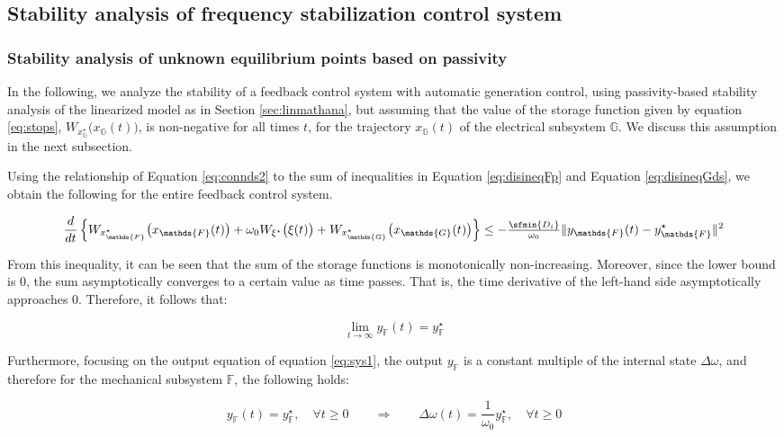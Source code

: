\documentclass[graybox, envcountchap]{svmult}
\begin{document}
\subsection{Stability analysis of frequency stabilization control system}\label{sec:potconv}

\smallskip
\subsubsection{Stability analysis of unknown equilibrium points based on passivity}

In the following, we analyze the stability of a feedback control system with
automatic generation control, using passivity-based stability analysis of the
linearized model as in Section \ref{sec:linmathana}, but assuming that the value
of the storage function given by equation \ref{eq:stops},
$W_{x^{\star}_{\mathds{G}}}\bigl(x_{\mathds{G}}(t) \bigr)$, is non-negative for
all times $t$, for the trajectory $x_{\mathds{G}}(t)$ of the electrical
subsystem $\mathds{G}$. We discuss this assumption in the next subsection.

Using the relationship of Equation \ref{eq:connds2} to the sum of inequalities
in Equation \ref{eq:disineqFp} and Equation \ref{eq:disineqGds}, we obtain the
following for the entire feedback control system.

\[
  \frac{d}{dt}  \left\{
  W_{x^{\star}_{\mathds{F}}}  \bigl( x_{\mathds{F}}(t) \bigr) 
  +
  \omega_0
  W_{\xi^{\star}} \bigl( \xi(t) \bigr) 
  +
  W_{x^{\star}_{\mathds{G}}} \bigl(x_{\mathds{G}}(t) \bigr)
  \right\} 
  \leq 
  - \tfrac{\sfmin \left\{ D_i \right\}}{\omega_0}
  \|y_{\mathds{F}}(t) -y^{\star}_{\mathds{F}}\|^2
\]

From this inequality, it can be seen that the sum of the storage functions is
monotonically non-increasing. Moreover, since the lower bound is 0, the sum
asymptotically converges to a certain value as time passes. That is, the time
derivative of the left-hand side asymptotically approaches 0. Therefore, it
follows that:

\[
  \lim_{t\rightarrow \infty}
  y_{\mathds{F}}(t) = y^{\star}_{\mathds{F}}
\]

Furthermore, focusing on the output equation of equation \ref{eq:sys1}, the
output $y_{\mathds{F}}$ is a constant multiple of the internal state $\Delta
\omega$, and therefore for the mechanical subsystem $\mathds{F}$, the following
holds: 

\begin{equation}\label{eq:Fobsnl}
y_{\mathds{F}}(t)  =y^{\star}_{\mathds{F}},\quad \forall t\geq 0 
\qquad \Longrightarrow \qquad
\Delta \omega(t)  =\frac{1}{\omega_0} y^{\star}_{\mathds{F}},\quad \forall t\geq 0 
\end{equation}
\end{document}
